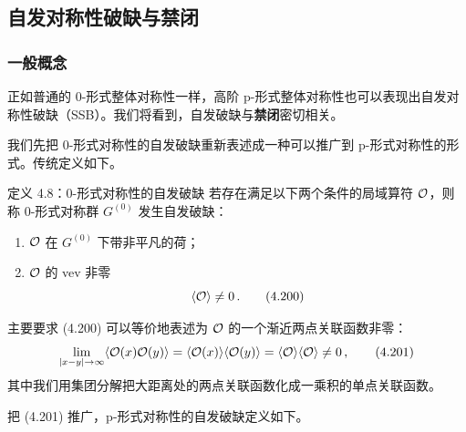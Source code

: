 
\subsection{自发对称性破缺与禁闭}

\subsubsection{一般概念}

正如普通的 0-形式整体对称性一样，高阶 p-形式整体对称性也可以表现出自发对称性破缺（SSB）。我们将看到，自发破缺与\textbf{禁闭}密切相关。



我们先把 0-形式对称性的自发破缺重新表述成一种可以推广到 p-形式对称性的形式。传统定义如下。

\begin{definitionbox}{定义 4.8：0-形式对称性的自发破缺}
若存在满足以下两个条件的局域算符 $\mathcal{O}$，则称 0-形式对称群 $G^{(0)}$ 发生自发破缺：
\begin{enumerate}[leftmargin=1.4em,itemsep=1pt,topsep=1pt]
\item $\mathcal{O}$ 在 $G^{(0)}$ 下带非平凡的荷；
\item $\mathcal{O}$ 的 vev 非零
\begin{equation}
  \langle\mathcal{O}\rangle\neq 0\,. \tag{4.200}
\end{equation}
\end{enumerate}
\end{definitionbox}

主要要求 (4.200) 可以等价地表述为 $\mathcal{O}$ 的一个渐近两点关联函数非零：
\begin{equation}
  \lim_{|x-y|\to\infty}\langle\mathcal{O}(x)\mathcal{O}(y)\rangle=\langle\mathcal{O}(x)\rangle\langle\mathcal{O}(y)\rangle=\langle\mathcal{O}\rangle\langle\mathcal{O}\rangle\neq 0\,, \tag{4.201}
\end{equation}
其中我们用集团分解把大距离处的两点关联函数化成一乘积的单点关联函数。


把 (4.201) 推广，p-形式对称性的自发破缺定义如下。


